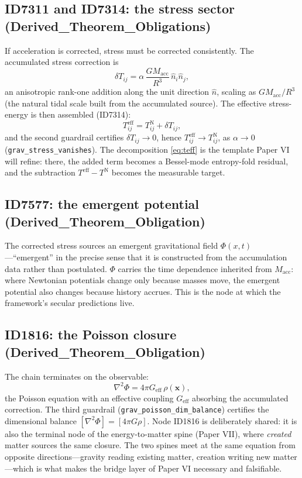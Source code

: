 \documentclass[11pt]{article}
\theoremstyle{remark}
\begin{document}
\subsection{ID7311 and ID7314: the stress sector (Derived\_Theorem\_Obligations)}

If acceleration is corrected, stress must be corrected consistently. The accumulated stress correction is
\begin{equation}
\delta T_{ij} = \alpha\, \frac{G M_{\mathrm{acc}}}{R^3}\, \hat{n}_i \hat{n}_j,
\label{eq:stress}
\end{equation}
an anisotropic rank-one addition along the unit direction $\hat{n}$, scaling as $G M_{\mathrm{acc}}/R^3$ (the natural tidal scale built from the accumulated source). The effective stress-energy is then assembled (ID7314):
\begin{equation}
T^{\mathrm{eff}}_{ij} = T^{\mathrm{N}}_{ij} + \delta T_{ij},
\label{eq:teff}
\end{equation}
and the second guardrail certifies $\delta T_{ij} \to 0$, hence $T^{\mathrm{eff}}_{ij} \to T^{\mathrm{N}}_{ij}$, as $\alpha \to 0$ (\texttt{grav\_stress\_vanishes}). The decomposition \eqref{eq:teff} is the template Paper VI will refine: there, the added term becomes a Bessel-mode entropy-fold residual, and the subtraction $T^{\mathrm{eff}} - T^{\mathrm{N}}$ becomes the measurable target.

\subsection{ID7577: the emergent potential (Derived\_Theorem\_Obligation)}

The corrected stress sources an emergent gravitational field $\Phi(x, t)$---``emergent'' in the precise sense that it is constructed from the accumulation data rather than postulated. $\Phi$ carries the time dependence inherited from $M_{\mathrm{acc}}$: where Newtonian potentials change only because masses move, the emergent potential also changes because history accrues. This is the node at which the framework's secular predictions live.

\subsection{ID1816: the Poisson closure (Derived\_Theorem\_Obligation)}

The chain terminates on the observable:
\begin{equation}
\nabla^2 \Phi = 4\pi G_{\mathrm{eff}}\, \rho(\mathbf{x}),
\label{eq:poisson}
\end{equation}
the Poisson equation with an effective coupling $G_{\mathrm{eff}}$ absorbing the accumulated correction. The third guardrail (\texttt{grav\_poisson\_dim\_balance}) certifies the dimensional balance $[\nabla^2\Phi] = [4\pi G\rho]$. Node ID1816 is deliberately shared: it is also the terminal node of the energy-to-matter spine (Paper VII), where \emph{created} matter sources the same closure. The two spines meet at the same equation from opposite directions---gravity reading existing matter, creation writing new matter---which is what makes the bridge layer of Paper VI necessary and falsifiable.
\end{document}
